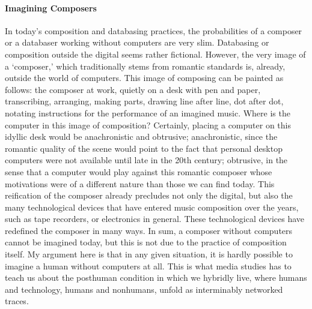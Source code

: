 
\paragraph{Imagining Composers}
In today's composition and databasing practices, the probabilities of a composer or a databaser working without computers are very slim. Databasing or composition outside the digital seems rather fictional. However, the very image of a `composer,' which traditionally stems from romantic standards is, already, outside the world of computers. This image of composing can be painted as follows: the composer at work, quietly on a desk with pen and paper, transcribing, arranging, making parts, drawing line after line, dot after dot, notating instructions for the performance of an imagined music. Where is the computer in this image of composition? Certainly, placing a computer on this idyllic desk would be anachronistic and obtrusive; anachronistic, since the romantic quality of the scene would point to the fact that personal desktop computers were not available until late in the 20th century; obtrusive, in the sense that a computer would play against this romantic composer whose motivations were of a different nature than those we can find today. This reification of the composer already precludes not only the digital, but also the many technological devices that have entered music composition over the years, such as tape recorders, or electronics in general. These technological devices have redefined the composer in many ways. In sum, a composer without computers cannot be imagined today, but this is not due to the practice of composition itself. My argument here is that in any given situation, it is hardly possible to imagine a human without computers at all. This is what media studies has to teach us about the posthuman condition in which we hybridly live, where humans and technology, humans and nonhumans, unfold as interminably networked traces.


